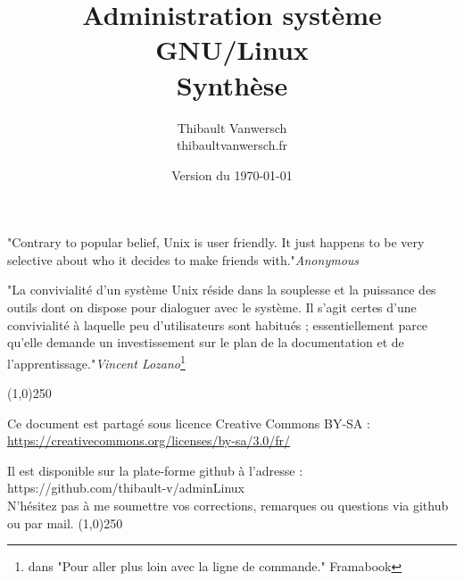 \documentclass[a4paper,11pt]{article}
\title{Administration système GNU/Linux\\Synthèse}
\author{
    Thibault Vanwersch \\
    thibault\at vanwersch.fr
}
\date{Version du \today}
\begin{document}
\maketitle
\par{"Contrary to popular belief, Unix is user friendly. It just happens to be very selective about who it decides to make friends with."\hfill\emph{Anonymous}}

\par{"La convivialité d’un système Unix réside dans la souplesse et la puissance des outils dont on dispose pour dialoguer avec le système. Il s’agit certes d’une convivialité à laquelle peu d’utilisateurs sont habitués ; essentiellement parce qu’elle demande un investissement sur le plan de la documentation et de l’apprentissage."\hfill\emph{Vincent Lozano}\footnote{dans "Pour aller plus loin avec la ligne de commande." Framabook}}

\begin{center}
\line(1,0){250}
\par Ce document est partagé sous licence Creative Commons BY-SA :\\
\url{https://creativecommons.org/licenses/by-sa/3.0/fr/}
\par Il est disponible sur la plate-forme github à l'adresse :\\
https://github.com/thibault-v/adminLinux \\
N'hésitez pas à me soumettre vos corrections, remarques ou questions via github ou par mail.
\line(1,0){250}
\end{center}
\end{document}
